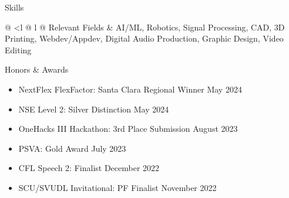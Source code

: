 \documentclass[
  11pt, %
]{public/resume/resume} %
\begin{document}

\begin{rSection}{Skills}

  \begin{tabular}{@{} <{\bfseries}l @{\hspace{6ex}} l @{}}
		Relevant Fields \& AI/ML, Robotics, Signal Processing, CAD, 3D Printing, Webdev/Appdev, Digital Audio Production, Graphic Design, Video Editing \\
	\end{tabular}

\end{rSection}


\begin{rSection}{Honors \& Awards}

  \begin{itemize}
      \setlength\itemsep{-0.7em} %
        
      \item NextFlex FlexFactor: Santa Clara Regional Winner \hfill May 2024
              
      \item NSE Level 2: Silver Distinction \hfill May 2024
              
      \item OneHacks III Hackathon: 3rd Place Submission \hfill August 2023
              
      \item PSVA: Gold Award \hfill July 2023
              
      \item CFL Speech 2: Finalist \hfill December 2022
              
      \item SCU/SVUDL Invitational: PF Finalist \hfill November 2022
              


    \end{itemize}

\end{rSection}
\end{document}
